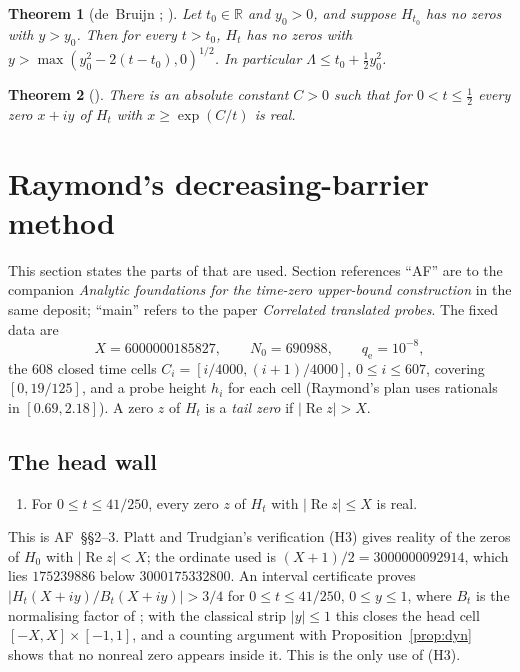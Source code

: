 \documentclass[11pt]{article}
\newtheorem{theorem}{Theorem}[section]
\theoremstyle{definition}
\newcommand{\LB}{\Lambda}
\newcommand{\R}{\mathbb{R}}
\newcommand{\qe}{q_{\mathrm e}}
\DeclareMathOperator{\Rea}{Re}
\begin{document}
\begin{theorem}[{de~Bruijn \cite[Theorem~13]{deBruijn50}; \cite[Theorem~3.2]{Polymath19}}]\label{thm:debruijn}
Let $t_0\in\R$ and $y_0>0$, and suppose $H_{t_0}$ has no zeros with $y>y_0$. Then for
every $t>t_0$, $H_t$ has no zeros with $y>\max(y_0^2-2(t-t_0),0)^{1/2}$. In particular
$\LB\le t_0+\frac12y_0^2$.
\end{theorem}

\begin{theorem}[{\cite[Theorem~1.5(i)]{Polymath19}}]\label{thm:confine}
There is an absolute constant $C>0$ such that for $0<t\le\frac12$ every zero $x+iy$ of
$H_t$ with $x\ge\exp(C/t)$ is real.
\end{theorem}

\section{Raymond's decreasing-barrier method}\label{sec:raymond}

This section states the parts of \cite{Raymond26} that are used. Section references
``AF'' are to the companion \emph{Analytic foundations for the time-zero upper-bound
construction} in the same deposit; ``main'' refers to the paper \emph{Correlated
translated probes}. The fixed data are
\[
X=6000000185827,\qquad N_0=690988,\qquad \qe=10^{-8},
\]
the $608$ closed time cells $C_i=[i/4000,(i+1)/4000]$, $0\le i\le607$, covering
$[0,19/125]$, and a probe height $h_i$ for each cell (Raymond's plan uses rationals in
$[0.69,2.18]$). A zero $z$ of $H_t$ is a \emph{tail zero} if $|\Rea z|>X$.

\subsection{The head wall}

\begin{enumerate}[leftmargin=3em]
\item[\textbf{(W)}] For $0\le t\le41/250$, every zero $z$ of $H_t$ with $|\Rea z|\le X$ is
real.
\end{enumerate}
This is AF~\S\S2--3. Platt and Trudgian's verification (H3) gives reality of the zeros
of $H_0$ with $|\Rea z|<X$; the ordinate used is $(X+1)/2=3000000092914$, which lies
$175239886$ below $3000175332800$. An interval certificate proves
$|H_t(X+iy)/B_t(X+iy)|>3/4$ for $0\le t\le41/250$, $0\le y\le1$, where $B_t$ is the
normalising factor of \cite{Polymath19}; with the classical strip $|y|\le1$ this closes
the head cell $[-X,X]\times[-1,1]$, and a counting argument with
Proposition~\ref{prop:dyn} shows that no nonreal zero appears inside it. This is the only
use of (H3).
\end{document}
